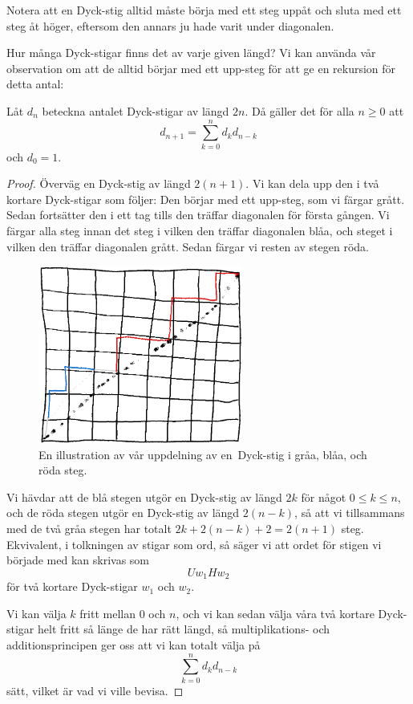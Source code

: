 \documentclass[nobib]{tufte-handout}
\begin{document}
Notera att en Dyck-stig alltid måste börja med ett steg uppåt och sluta med ett steg åt höger, eftersom den annars ju hade varit under diagonalen.

Hur många Dyck-stigar finns det av varje given längd? Vi kan använda vår observation om att de alltid börjar med ett upp-steg för att ge en rekursion för detta antal:

\begin{lemma}\label{dyck_path_recursion_lemma}
    Låt $d_n$ beteckna antalet Dyck-stigar av längd $2n$. Då gäller det för alla $n \geq 0$ att
    $$d_{n+1} = \sum_{k=0}^{n} d_k d_{n-k}$$
    och $d_0 = 1$.

    \begin{proof}
        Överväg en Dyck-stig av längd $2(n+1)$. Vi kan dela upp den i två kortare Dyck-stigar som följer: Den börjar med ett upp-steg, som vi färgar grått. Sedan fortsätter den i ett tag tills den träffar diagonalen för första gången. Vi färgar alla steg innan det steg i vilken den träffar diagonalen blåa, och steget i vilken den träffar diagonalen grått. Sedan färgar vi resten av stegen röda.

        \begin{figure}
            \centering
            \includegraphics[width = 0.6\textwidth]{graphics/Dyck_path_recursion.png}
            \caption{En illustration av vår uppdelning av en\, Dyck-stig i gråa, blåa, och röda steg.}
        \end{figure}

        Vi hävdar att de blå stegen utgör en Dyck-stig av längd $2k$ för något $0 \leq k \leq n$, och de röda stegen utgör en Dyck-stig av längd $2(n-k)$, så att vi tillsammans med de två gråa stegen har totalt $2k + 2(n-k) + 2 = 2(n+1)$ steg. Ekvivalent, i tolkningen av stigar som ord, så säger vi att ordet för stigen vi började med kan skrivas som
        $$Uw_1Hw_2$$
        för två kortare Dyck-stigar $w_1$ och $w_2$.

        Vi kan välja $k$ fritt mellan $0$ och $n$, och vi kan sedan välja våra två kortare Dyck-stigar helt fritt så länge de har rätt längd, så multiplikations- och additionsprincipen ger oss att vi kan totalt välja på
        $$\sum_{k=0}^{n} d_k d_{n-k}$$
        sätt, vilket är vad vi ville bevisa.
    \end{proof}
\end{lemma}
\end{document}

